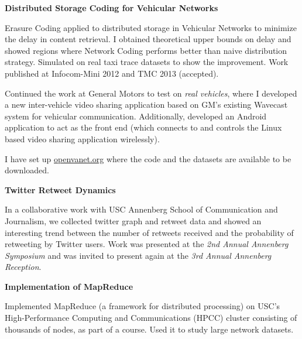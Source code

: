 \documentclass[margin,line]{resume}
\begin{document}
\begin{resume}
	\textbf{Distributed Storage Coding for Vehicular Networks}
  \begin{list2}
   \item Erasure Coding applied to distributed storage in Vehicular Networks to minimize the delay in content retrieval. I obtained theoretical upper bounds on delay and showed regions where Network Coding performs better than naive distribution strategy. Simulated on real taxi trace datasets to show the improvement. Work published at Infocom-Mini 2012 and TMC 2013 (accepted).
   \item Continued the work at General Motors to test on \textsl{real vehicles}, where I developed a new inter-vehicle video sharing application based on GM's existing Wavecast system for vehicular communication. Additionally, developed an Android application to act as the front end (which connects to and controls the Linux based video sharing application wirelessly).
   \item I have set up \href{http://www.openvanet.org}{openvanet.org} where the code and the datasets are available to be downloaded.
   \end{list2}
      
  \textbf{Twitter Retweet Dynamics}
  \begin{list2}
   \item In a collaborative work with USC Annenberg School of Communication and Journalism, we collected twitter graph and retweet data and showed an interesting trend between the number of retweets received and the probability of retweeting by Twitter users. Work was presented at the \textsl{2nd Annual Annenberg Symposium} and was invited to present again at the \textsl{3rd Annual Annenberg Reception}.
  \end{list2}
  
  \textbf{Implementation of MapReduce}
  \begin{list2}
  \item Implemented MapReduce (a framework for distributed processing) on USC's High-Performance Computing and Communications (HPCC) cluster consisting of thousands of nodes, as part of a course. Used it to study large network datasets. 
  \end{list2}
    

\end{resume}
\end{document}
